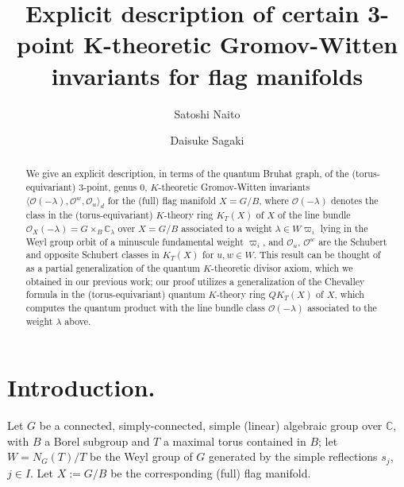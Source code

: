\documentclass[11pt,a4paper,reqno,dvipdfmx]{amsart}
\title[Explicit description of certain 3-point K-theoretic Gromov-Witten invariants]
{Explicit description of certain 3-point K-theoretic Gromov-Witten invariants for flag manifolds}
\author[S.~Naito]{Satoshi Naito}
\author[D.~Sagaki]{Daisuke Sagaki}
\numberwithin{equation}{section}
\newcommand{\BC}{\mathbb{C}}
\newcommand{\CO}{\mathcal{O}}
\theoremstyle{plain}
\theoremstyle{definition}
\theoremstyle{remark}
\begin{document}


%
\begin{abstract}
We give an explicit description, in terms of the quantum Bruhat graph, 
of the (torus-equivariant) 3-point, genus 0, $K$-theoretic Gromov-Witten invariants 
$\langle \CO(- \lambda), \CO^{w}, \CO_{u} \rangle_{d}$ for 
the (full) flag manifold $X = G/B$, where $\CO(- \lambda)$ denotes 
the class in the (torus-equivariant) $K$-theory ring $K_{T}(X)$ of $X$ of 
the line bundle $\CO_{X}(- \lambda) = G \times_{B} \BC_{\lambda}$ over $X = G/B$ 
associated to a weight $\lambda \in W \varpi_i$ lying 
in the Weyl group orbit of a minuscule fundamental weight $\varpi_i$, 
and $\CO_{u}$, $\CO^{w}$ are the Schubert and opposite Schubert classes 
in $K_{T}(X)$ for $u, w \in W$. 
This result can be thought of as a partial generalization of 
the quantum $K$-theoretic divisor axiom, which we obtained 
in our previous work; our proof utilizes a generalization of 
the Chevalley formula in the (torus-equivariant) quantum $K$-theory ring 
$QK_{T}(X)$ of $X$, which computes the quantum product 
with the line bundle class $\CO(- \lambda)$ associated to the weight $\lambda$ above. 
\end{abstract}

\maketitle

\section{Introduction.}

Let $G$ be a connected, simply-connected, simple (linear) algebraic group over $\BC$, 
with $B$ a Borel subgroup and $T$ a maximal torus contained in $B$; 
let $W = N_{G}(T)/T$ be the Weyl group of $G$ generated by 
the simple reflections $s_j$, $j \in I$. 
Let $X := G/B$ be the corresponding (full) flag manifold. 
\end{document}
